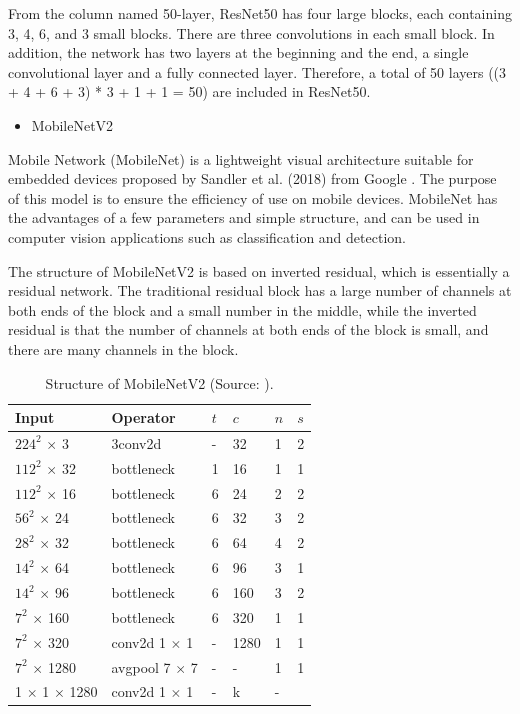 \documentclass[sensors,article,submit,moreauthors,pdftex]{Definitions/mdpi}
\begin{document}
\begin{paracol}{2}
\linenumbers
\switchcolumn

From the column named 50-layer, ResNet50 has four large blocks, each containing 3, 4, 6, and 3 small blocks. There are three convolutions in each small block. In addition, the network has two layers at the beginning and the end, a single convolutional layer and a fully connected layer. Therefore, a total of 50 layers ((3 + 4 + 6 + 3) * 3 + 1 + 1 = 50) are included in ResNet50.


\begin{itemize}
\item MobileNetV2
\end{itemize}

Mobile Network (MobileNet) is a lightweight visual architecture suitable for embedded devices proposed by Sandler et al. (2018) from Google \cite{sandler2018mobilenetv2}. The purpose of this model is to ensure the efficiency of use on mobile devices. MobileNet has the advantages of a few parameters and simple structure, and can be used in computer vision applications such as classification and detection.

The structure of MobileNetV2 is based on inverted residual, which is essentially a residual network. The traditional residual block has a large number of channels at both ends of the block and a small number in the middle, while the inverted residual is that the number of channels at both ends of the block is small, and there are many channels in the block.


\begin{table}[htbp]
\centering
\caption{Structure of MobileNetV2 (Source: \cite{sandler2018mobilenetv2}).}
\begin{tabular}{llllll} 
\toprule
\textbf{Input}&\textbf{Operator}&\textbf{$t$}&\textbf{$c$}&\textbf{$n$}&\textbf{$s$}\\
\midrule
$224^2$ $\times$ 3&3conv2d & - & 32 & 1 & 2\\
$112^2$ $\times$ 32& bottleneck & 1 & 16 & 1 &1\\
$112^2$ $\times$ 16& bottleneck & 6 & 24 & 2 &2\\
$56^2$ $\times$ 24& bottleneck & 6 & 32 & 3 &2\\
$28^2$ $\times$ 32& bottleneck & 6 & 64 & 4 &2\\
$14^2$ $\times$ 64& bottleneck & 6 & 96 & 3 &1\\
$14^2$ $\times$ 96& bottleneck & 6 & 160 & 3 &2\\
$7^2$ $\times$ 160& bottleneck & 6 & 320 & 1 &1\\
$7^2$ $\times$ 320& conv2d 1 $\times$ 1 & - & 1280 & 1 &1\\
$7^2$ $\times$ 1280& avgpool 7 $\times$ 7& - & - & 1& 1\\
1 $\times$ 1 $\times$ 1280& conv2d 1 $\times$ 1& - & k & - & \\
\bottomrule
\end{tabular}
\label{tbl:MobileNetV2}
\end{table}




\end{paracol}
\end{document}
